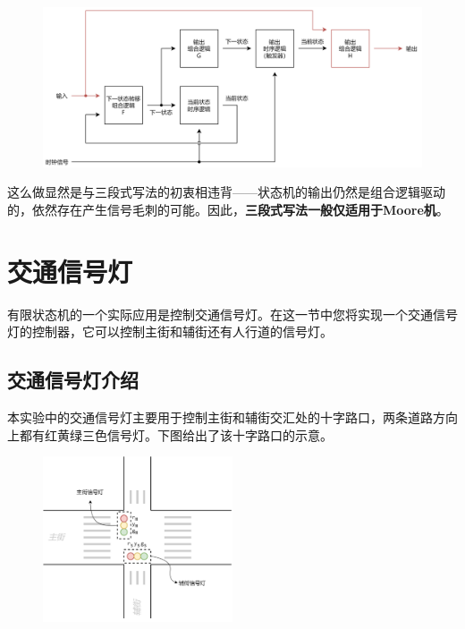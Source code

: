 \documentclass{ctexart}
\begin{document}
\begin{figure}[H]
    \centering
    \includegraphics[width=\textwidth]{lab2/8.png}
\end{figure}

这么做显然是与三段式写法的初衷相违背——状态机的输出仍然是组合逻辑驱动的，依然存在产生信号毛刺的可能。因此，\textbf{三段式写法一般仅适用于Moore机}。


\section{交通信号灯}

有限状态机的一个实际应用是控制交通信号灯。在这一节中您将实现一个交通信号灯的控制器，它可以控制主街和辅街还有人行道的信号灯。

\subsection{交通信号灯介绍}

本实验中的交通信号灯主要用于控制主街和辅街交汇处的十字路口，两条道路方向上都有红黄绿三色信号灯。下图给出了该十字路口的示意。

\begin{figure}[H]
    \centering
    \includegraphics[width=0.5\textwidth]{lab2/9.png}
\end{figure}
\end{document}
